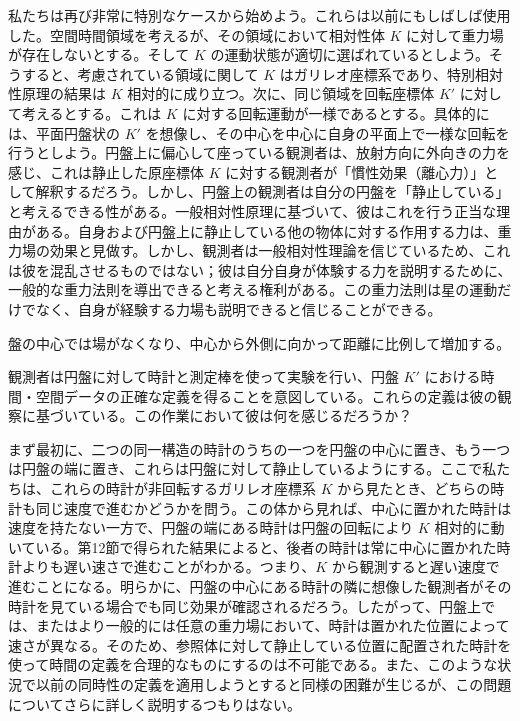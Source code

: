 \documentclass[a4paper,11pt,openany]{ltjsbook}
\begin{document}
私たちは再び非常に特別なケースから始めよう。これらは以前にもしばしば使用した。空間時間領域を考えるが、その領域において相対性体 $K$ に対して重力場が存在しないとする。そして $K$ の運動状態が適切に選ばれているとしよう。そうすると、考慮されている領域に関して $K$ はガリレオ座標系であり、特別相対性原理の結果は $K$ 相対的に成り立つ。次に、同じ領域を回転座標体 $K′$ に対して考えるとする。これは $K$ に対する回転運動が一様であるとする。具体的には、平面円盤状の $K′$ を想像し、その中心を中心に自身の平面上で一様な回転を行うとしよう。円盤上に偏心して座っている観測者は、放射方向に外向きの力を感じ、これは静止した原座標体 $K$ に対する観測者が「慣性効果（離心力）」として解釈するだろう。しかし、円盤上の観測者は自分の円盤を「静止している」と考えるできる性がある。一般相対性原理に基づいて、彼はこれを行う正当な理由がある。自身および円盤上に静止している他の物体に対する作用する力は、重力場の効果と見做す。しかし、観測者は一般相対性理論を信じているため、これは彼を混乱させるものではない；彼は自分自身が体験する力を説明するために、一般的な重力法則を導出できると考える権利がある。この重力法則は星の運動だけでなく、自身が経験する力場も説明できると信じることができる。

 盤の中心では場がなくなり、中心から外側に向かって距離に比例して増加する。

観測者は円盤に対して時計と測定棒を使って実験を行い、円盤 \( K' \) における時間・空間データの正確な定義を得ることを意図している。これらの定義は彼の観察に基づいている。この作業において彼は何を感じるだろうか？

まず最初に、二つの同一構造の時計のうちの一つを円盤の中心に置き、もう一つは円盤の端に置き、これらは円盤に対して静止しているようにする。ここで私たちは、これらの時計が非回転するガリレオ座標系 \( K \) から見たとき、どちらの時計も同じ速度で進むかどうかを問う。この体から見れば、中心に置かれた時計は速度を持たない一方で、円盤の端にある時計は円盤の回転により \( K \) 相対的に動いている。第12節で得られた結果によると、後者の時計は常に中心に置かれた時計よりも遅い速さで進むことがわかる。つまり、\( K \) から観測すると遅い速度で進むことになる。明らかに、円盤の中心にある時計の隣に想像した観測者がその時計を見ている場合でも同じ効果が確認されるだろう。したがって、円盤上では、またはより一般的には任意の重力場において、時計は置かれた位置によって速さが異なる。そのため、参照体に対して静止している位置に配置された時計を使って時間の定義を合理的なものにするのは不可能である。また、このような状況で以前の同時性の定義を適用しようとすると同様の困難が生じるが、この問題についてさらに詳しく説明するつもりはない。
\end{document}
